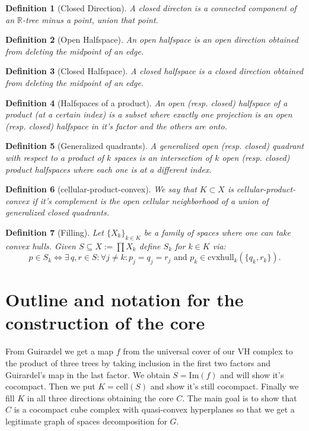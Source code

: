 \documentclass{article}
\theoremstyle{mystyle}
\newtheorem{defn}{Definition}
\theoremstyle{remark}
\begin{document}
\begin{defn}[Closed Direction] A closed directon is a connected component of an \(\mathbb{R}\)-tree minus a point, union that point.
\end{defn}
\begin{defn}[Open Halfspace] An open halfspace is an open direction obtained from deleting the midpoint of an edge.
\end{defn}
\begin{defn}[Closed Halfspace] A closed halfspace is a closed direction obtained from deleting the midpoint of an edge.
\end{defn}
\begin{defn}[Halfspaces of a product] An open (resp. closed) halfspace of a product (at a certain index) is a subset where exactly one projection is an open (resp. closed)  halfspace in it's factor and the others are onto.
\end{defn}
\begin{defn}[Generalized quadrants] A generalized open (resp. closed) quadrant with respect to a product of \(k\) spaces is an intersection of \(k\) open (resp. closed) product halfspaces where each one is at a different index.
\end{defn}
\begin{defn}[cellular-product-convex] We say that \(K \subset X\) is cellular-product-convex if it's complement is the open cellular neighborhood of a union of generalized closed quadrants.
\end{defn}

\begin{defn}
	[Filling]
    Let \(\{X_{k}\}_{k \in K}\) be a family of spaces where one can take convex hulls. Given \(S \subseteq X := \prod X_{k}\) define \(S_{k}\) for \(k \in K\) via: \[p \in S_{k} \iff \exists \,q,r \in S: \forall j \neq k: p_{j} = q_{j} = r_{j} \text{ and } p_{k} \in \text{cvxhull}_k (\{q_{k} , r_{k}\}).\] 
\end{defn}


\section{Outline and notation for the construction of the core}

    From Guirardel we get a map \(f\) from the universal cover of our VH complex to the product of three trees by taking inclusion in the first two factors and Guirardel's map in the last factor. We obtain \(S = \text{Im}(f)\) and will show it's cocompact. Then we put \(K = \text{cell}{(S)}\) and show it's still cocompact. Finally we fill \(K\) in all three directions obtaining the core \(C\). The main goal is to show that \(C\) is a cocompact cube complex with quasi-convex hyperplanes so that we get a legitimate graph of spaces decomposition for \(G\).
\end{document}
